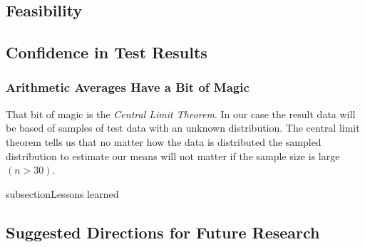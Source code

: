 \subsection{Feasibility}
\subsection{Confidence in Test Results}
\subsubsection{Arithmetic Averages Have a Bit of Magic}
That bit of magic is the \emph{Central Limit Theorem}. In our case the result data will be based of samples of test data with an unknown distribution. The central limit theorem tells us that no matter how the data is distributed the sampled distribution to estimate our means will not matter if the sample size is large $(n > 30)$.

subsection{Lessons learned}
\subsection{Suggested Directions for Future Research}